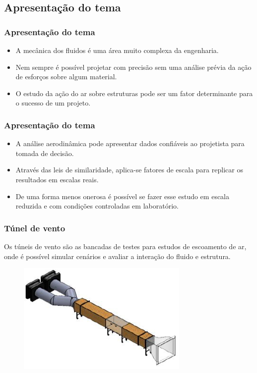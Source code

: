 \subsection{Apresentação do tema}

\begin{frame}
\frametitle{Apresentação do tema}
\begin{itemize}
    \item A mecânica dos fluidos é uma área muito complexa da engenharia.
    \item Nem sempre é possível  projetar com precisão sem uma análise prévia da ação de esforços sobre algum material. 
    \item O estudo da ação do ar sobre estruturas pode ser um fator determinante para o sucesso de um projeto. 
\end{itemize}
\end{frame}

\begin{frame}
\frametitle{Apresentação do tema}
\begin{itemize}
    \item A análise aerodinâmica pode apresentar dados confiáveis ao projetista para tomada de decisão. 
    \item Através das leis de similaridade, aplica-se fatores de escala para replicar os resultados em escalas reais. 
    \item De uma forma menos onerosa é possível se fazer esse estudo em escala reduzida e com condições controladas em laboratório.
\end{itemize}
\end{frame}

\begin{frame}
\frametitle{Túnel de vento}

Os túneis de vento são as bancadas de testes para estudos de escoamento de ar, onde é possível simular cenários e avaliar a interação do fluido e estrutura.

\begin{figure}
\centering
\includegraphics[scale = 0.6]{figuras/tuneldevento}
\end{figure}

\end{frame}
 
